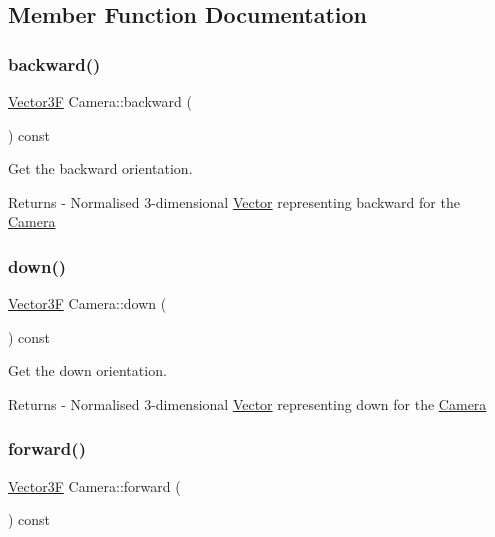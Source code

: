 \subsection{Member Function Documentation}
\mbox{\label{class_camera_afe69d158ab2f83ed2a4376d031efc80b}} 
\subsubsection{\texorpdfstring{backward()}{backward()}}
{\footnotesize\ttfamily \mbox{\hyperlink{class_vector3}{Vector3F}} Camera\+::backward (\begin{DoxyParamCaption}{ }\end{DoxyParamCaption}) const}

Get the backward orientation. \begin{DoxyReturn}{Returns}
-\/ Normalised 3-\/dimensional \mbox{\hyperlink{class_vector}{Vector}} representing \textquotesingle{}backward\textquotesingle{} for the \mbox{\hyperlink{class_camera}{Camera}} 
\end{DoxyReturn}
\mbox{\label{class_camera_aac84f1893c5e9d6fba4b808d28a76560}} 
\subsubsection{\texorpdfstring{down()}{down()}}
{\footnotesize\ttfamily \mbox{\hyperlink{class_vector3}{Vector3F}} Camera\+::down (\begin{DoxyParamCaption}{ }\end{DoxyParamCaption}) const}

Get the down orientation. \begin{DoxyReturn}{Returns}
-\/ Normalised 3-\/dimensional \mbox{\hyperlink{class_vector}{Vector}} representing \textquotesingle{}down\textquotesingle{} for the \mbox{\hyperlink{class_camera}{Camera}} 
\end{DoxyReturn}
\mbox{\label{class_camera_a862269b762daf00f14a5926d77331ec9}} 
\subsubsection{\texorpdfstring{forward()}{forward()}}
{\footnotesize\ttfamily \mbox{\hyperlink{class_vector3}{Vector3F}} Camera\+::forward (\begin{DoxyParamCaption}{ }\end{DoxyParamCaption}) const}

